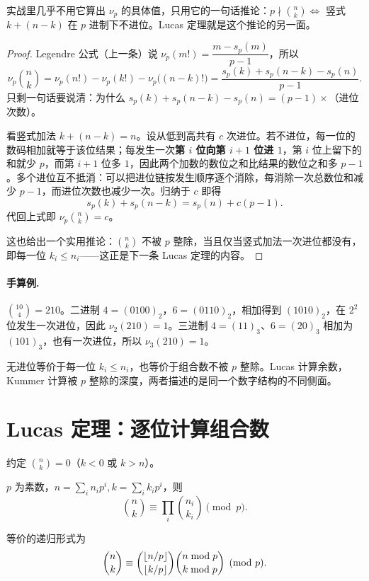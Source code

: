 \begin{tip}
实战里几乎不用它算出 $\nu_p$ 的具体值，只用它的一句话推论：$p\nmid\binom nk\iff$ 竖式 $k+(n-k)$ 在 $p$ 进制下不进位。Lucas 定理就是这个推论的另一面。
\end{tip}


\begin{proof}
Legendre 公式（上一条）说 $\nu_p(m!)=\dfrac{m-s_p(m)}{p-1}$，所以
\[
 \nu_p\binom{n}{k}=\nu_p(n!)-\nu_p(k!)-\nu_p\big((n-k)!\big)
 =\frac{s_p(k)+s_p(n-k)-s_p(n)}{p-1}.
\]
只剩一句话要说清：为什么 $s_p(k)+s_p(n-k)-s_p(n)=(p-1)\times$（进位次数）。

看竖式加法 $k+(n-k)=n$。设从低到高共有 $c$ 次进位。若不进位，每一位的数码相加就等于该位结果；每发生一次\textbf{第 $i$ 位向第 $i+1$ 位进 $1$}，第 $i$ 位上留下的和就少 $p$，而第 $i+1$ 位多 $1$，因此两个加数的数位之和比结果的数位之和多 $p-1$。多个进位互不抵消：可以把进位链按发生顺序逐个消除，每消除一次总数位和减少 $p-1$，而进位次数也减少一次。归纳于 $c$ 即得
\[
 s_p(k)+s_p(n-k)=s_p(n)+c(p-1).
\]
代回上式即 $\nu_p\binom nk=c$。

这也给出一个实用推论：$\binom nk$ 不被 $p$ 整除，当且仅当竖式加法一次进位都没有，即每一位 $k_i\le n_i$——这正是下一条 Lucas 定理的内容。
\end{proof}
\paragraph{手算例.} $\binom{10}{4}=210$。二进制 $4=(0100)_2$，$6=(0110)_2$，相加得到 $(1010)_2$，在 $2^2$ 位发生一次进位，因此 $\nu_2(210)=1$。三进制 $4=(11)_3$、$6=(20)_3$ 相加为 $(101)_3$，也有一次进位，所以 $\nu_3(210)=1$。
\begin{teach}
无进位等价于每一位 $k_i\le n_i$，也等价于组合数不被 $p$ 整除。Lucas 计算余数，Kummer 计算被 $p$ 整除的深度，两者描述的是同一个数字结构的不同侧面。
\end{teach}


\section{Lucas 定理：逐位计算组合数}
约定 $\binom nk=0$（$k<0$ 或 $k>n$）。
\begin{theorem}[Lucas]
$p$ 为素数，$n=\sum_i n_ip^i,k=\sum_i k_ip^i$，则
\[
 \binom nk\equiv\prod_i\binom{n_i}{k_i}\pmod p.
\]


等价的递归形式为
\[
 \binom nk\equiv\binom{\left\lfloor n/p\right\rfloor}{\left\lfloor k/p\right\rfloor}
 \binom{n\bmod p}{k\bmod p}\pmod p.
\]
\end{theorem}

